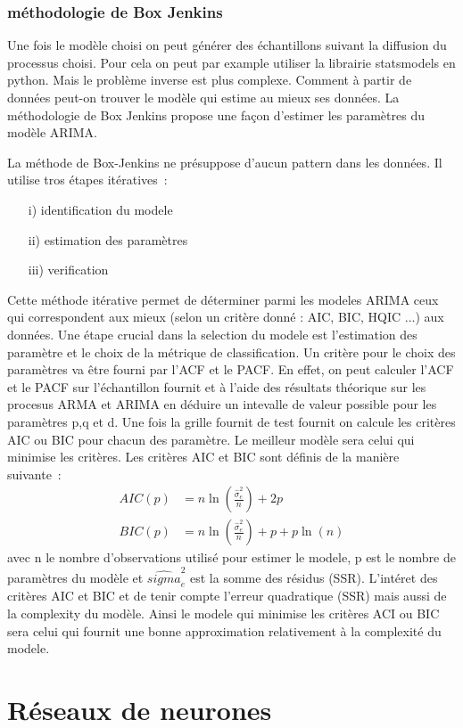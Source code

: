 \documentclass[11pt]{scrartcl} %
\begin{document}
\subsubsection{méthodologie de Box Jenkins}
Une fois le modèle choisi on peut générer des échantillons suivant la diffusion du processus choisi. Pour cela on peut par example utiliser la librairie statsmodels en python. Mais le problème inverse est plus complexe. Comment à partir de données peut-on trouver le modèle qui estime au mieux ses données. La méthodologie de Box Jenkins propose une façon d'estimer les paramètres du modèle ARIMA.


La méthode de Box-Jenkins \cite{BoxJenkins} ne présuppose d'aucun pattern dans les données. Il utilise tros étapes itératives~:
\begin{itemize}
\item[i)] identification du modele
\item[ii)] estimation des paramètres
\item[iii)] verification
\end{itemize}
Cette méthode itérative permet de déterminer parmi les modeles ARIMA ceux qui correspondent aux mieux (selon un critère donné : AIC, BIC, HQIC ...) aux données.
Une étape crucial dans la selection du modele est l'estimation des paramètre et le choix de la métrique de classification. Un critère pour le choix des paramètres va être fourni par l'ACF et le PACF. En effet, on peut calculer l'ACF et le PACF sur l'échantillon fournit et à l'aide des résultats théorique sur les procesus ARMA et ARIMA en déduire un intevalle de valeur possible pour les paramètres p,q et d. Une fois la grille fournit de test fournit on calcule les critères AIC ou BIC pour chacun des paramètre. Le meilleur modèle sera celui qui minimise les critères. Les critères AIC et BIC sont définis de la manière suivante~:
\begin{align*}
AIC(p)&=n\ln\left({\frac{\hat{\sigma}_e^2}{n}}\right)+2p\\
BIC(p)&=n\ln\left({\frac{\hat{\sigma}_e^2}{n}}\right)+p+p\ln(n)
\end{align*}
avec n le nombre d'observations utilisé pour estimer le modele, p est le nombre de paramètres du modèle et $\hat{sigma}_e^2$ est la somme des résidus (SSR). L'intéret des critères AIC et BIC et de tenir compte l'erreur quadratique (SSR) mais aussi de la complexity du modèle. Ainsi le modele qui minimise les critères ACI ou BIC sera celui qui fournit une bonne approximation relativement à la complexité du modele.
\section{Réseaux de neurones}
\end{document}
